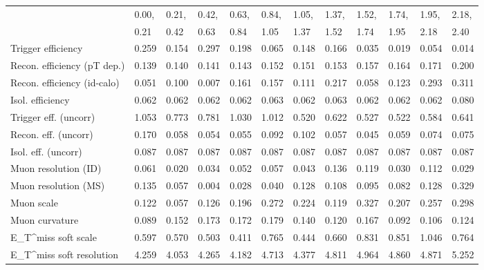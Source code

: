 \begin{tabular}{l|p{0.6cm}p{0.6cm}p{0.6cm}p{0.6cm}p{0.6cm}p{0.6cm}p{0.6cm}p{0.6cm}p{0.6cm}p{0.6cm}p{0.6cm}}
\hline
   & 0.00, & 0.21, & 0.42, & 0.63, & 0.84, & 1.05, & 1.37, & 1.52, & 1.74, & 1.95, & 2.18,  \\ 
   & 0.21 & 0.42 & 0.63 & 0.84 & 1.05 & 1.37 & 1.52 & 1.74 & 1.95 & 2.18 & 2.40  \\ 
\hline
Trigger efficiency                       & 0.259 & 0.154 & 0.297 & 0.198 & 0.065 & 0.148 & 0.166 & 0.035 & 0.019 & 0.054 & 0.014 \\
Recon. efficiency (pT dep.)              & 0.139 & 0.140 & 0.141 & 0.143 & 0.152 & 0.151 & 0.153 & 0.157 & 0.164 & 0.171 & 0.200 \\
Recon. efficiency (id-calo)              & 0.051 & 0.100 & 0.007 & 0.161 & 0.157 & 0.111 & 0.217 & 0.058 & 0.123 & 0.293 & 0.311 \\
Isol. efficiency                         & 0.062 & 0.062 & 0.062 & 0.062 & 0.063 & 0.062 & 0.063 & 0.062 & 0.062 & 0.062 & 0.080 \\
Trigger eff. (uncorr)                    & 1.053 & 0.773 & 0.781 & 1.030 & 1.012 & 0.520 & 0.622 & 0.527 & 0.522 & 0.584 & 0.641 \\
Recon. eff. (uncorr)                     & 0.170 & 0.058 & 0.054 & 0.055 & 0.092 & 0.102 & 0.057 & 0.045 & 0.059 & 0.074 & 0.075 \\
Isol. eff. (uncorr)                      & 0.087 & 0.087 & 0.087 & 0.087 & 0.087 & 0.087 & 0.087 & 0.087 & 0.087 & 0.087 & 0.087 \\
Muon resolution (ID)                     & 0.061 & 0.020 & 0.034 & 0.052 & 0.057 & 0.043 & 0.136 & 0.119 & 0.030 & 0.112 & 0.029 \\
Muon resolution (MS)                     & 0.135 & 0.057 & 0.004 & 0.028 & 0.040 & 0.128 & 0.108 & 0.095 & 0.082 & 0.128 & 0.329 \\
Muon scale                               & 0.122 & 0.057 & 0.126 & 0.196 & 0.272 & 0.224 & 0.119 & 0.327 & 0.207 & 0.257 & 0.298 \\
Muon curvature                           & 0.089 & 0.152 & 0.173 & 0.172 & 0.179 & 0.140 & 0.120 & 0.167 & 0.092 & 0.106 & 0.124 \\
E_{T}^{miss} soft scale                  & 0.597 & 0.570 & 0.503 & 0.411 & 0.765 & 0.444 & 0.660 & 0.831 & 0.851 & 1.046 & 0.764 \\
E_{T}^{miss} soft resolution             & 4.259 & 4.053 & 4.265 & 4.182 & 4.713 & 4.377 & 4.811 & 4.964 & 4.860 & 4.871 & 5.252 \\

\end{tabular}
